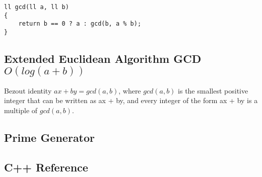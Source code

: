\documentclass[10pt,oneside]{article}
\begin{document}
\begin{landscape}
\begin{multicols}{2}
\begin{lstlisting}
ll gcd(ll a, ll b)
{
    return b == 0 ? a : gcd(b, a % b);
}
\end{lstlisting}

\subsection{Extended Euclidean Algorithm GCD $O(log(a + b))$}

Bezout identity $ax + by = gcd(a, b)$, where $gcd(a, b)$ is the smallest positive integer that can be written as ax + by, and every integer of the form ax + by is a multiple of $gcd(a, b)$.



\subsection{Prime Generator}


\subsection{C++ Reference}




%

%

%



\end{multicols}
\end{landscape}
\end{document}
